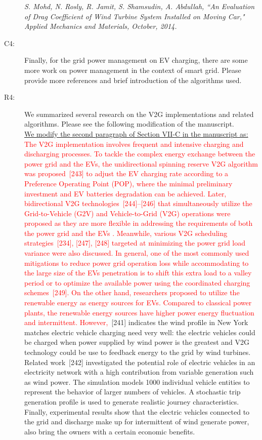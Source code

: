 \documentclass[onecolumn]{IEEEconf}
\begin{document}
\begin{description}
\textit{S. Mohd, N. Rosly, R. Jamit, S. Shamsudin, A. Abdullah, ``An Evaluation of Drag Coefficient of Wind Turbine System Installed on Moving Car," Applied Mechanics and Materials, October, 2014.}
~\\

\item [C4: ] Finally, for the grid power management on EV charging, there are some more work on power management in the context of smart grid. Please provide more references and brief introduction of the algorithms used.
\item [R4: ] We summarized several research on the V2G implementations and related algorithms. Please see the following modification of the manuscript.\\

\underline{We modify the second paragraph of Section VII-C in the manuscript as:}\\
\textcolor{red}{The V2G implementation involves frequent and intensive charging and discharging processes. To tackle the complex energy exchange between the power grid and the EVs, the unidirectional spinning reserve V2G algorithm was proposed~[243] to adjust the EV charging rate according to a Preference Operating Point (POP), where the minimal preliminary investment and EV batteries degradation can be achieved. Later, bidirectional V2G technologies~[244]--[246] that simultaneously utilize the Grid-to-Vehicle (G2V) and Vehicle-to-Grid (V2G) operations were proposed as they are more flexible in addressing the requirements of both the power grid and the EVs . Meanwhile, various V2G scheduling strategies~[234], [247], [248] targeted at minimizing the power grid load variance were also discussed. In general, one of the most commonly used mitigations to reduce power grid operation loss while accommodating to the large size of the EVs penetration is to shift this extra load to a valley period or to optimize the available power using the coordinated charging schemes~[249]. On the other hand, researchers proposed to utilize the renewable energy as energy sources for EVs. Compared to classical power plants, the renewable energy sources have higher power energy fluctuation and intermittent. However,}~[241] indicates the wind profile in New York matches electric vehicle charging need very well: the electric vehicles could be charged when power supplied by wind power is the greatest and V2G technology could be use to feedback energy to the grid by wind turbines.
Related work~[242] investigated the potential role of electric vehicles in an electricity network with a high contribution from variable generation such as wind power. The simulation models 1000 individual vehicle entities to represent the behavior of larger numbers of vehicles. 
A stochastic trip generation profile is used to generate realistic journey characteristics. 
Finally, experimental results show that the electric vehicles connected to the grid and discharge make up for intermittent of wind generate power, also bring the owners with a certain economic benefits.
\\
\end{description}
\end{document}

